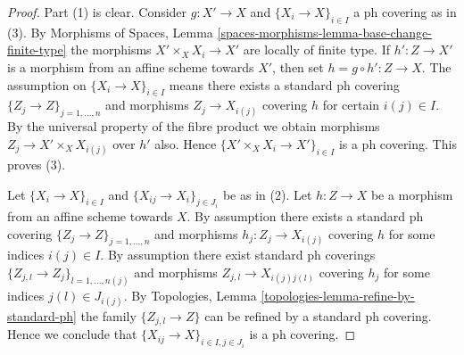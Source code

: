 \documentclass{stacks-project}
\theoremstyle{plain}
\theoremstyle{definition}
\theoremstyle{remark}
\numberwithin{equation}{subsection}
\begin{document}
\begin{proof}
Part (1) is clear. Consider $g : X' \to X$ and
$\{X_i \to X\}_{i\in I}$ a ph covering as in (3). By
Morphisms of Spaces, Lemma \ref{spaces-morphisms-lemma-base-change-finite-type}
the morphisms $X' \times_X X_i \to X'$ are locally of finite type.
If $h' : Z \to X'$ is a morphism from an affine scheme
towards $X'$, then set $h = g \circ h' : Z \to X$. The assumption
on $\{X_i \to X\}_{i\in I}$ means there exists a standard ph covering
$\{Z_j \to Z\}_{j = 1, \ldots, n}$ and morphisms $Z_j \to X_{i(j)}$ covering
$h$ for certain $i(j) \in I$. By the universal property of the fibre product
we obtain morphisms $Z_j \to X' \times_X X_{i(j)}$ over $h'$ also.
Hence $\{X' \times_X X_i \to X'\}_{i\in I}$ is a ph covering.
This proves (3).

\medskip\noindent
Let $\{X_i \to X\}_{i\in I}$ and $\{X_{ij} \to X_i\}_{j\in J_i}$ be as
in (2). Let $h : Z \to X$ be a morphism from an affine scheme towards $X$.
By assumption there exists a standard ph covering
$\{Z_j \to Z\}_{j = 1, \ldots, n}$ and morphisms $h_j : Z_j \to X_{i(j)}$
covering $h$ for some indices $i(j) \in I$. By assumption there exist
standard ph coverings
$\{Z_{j, l} \to Z_j\}_{l = 1, \ldots, n(j)}$
and morphisms $Z_{j, l} \to X_{i(j)j(l)}$ covering
$h_j$ for some indices $j(l) \in J_{i(j)}$. By
Topologies, Lemma \ref{topologies-lemma-refine-by-standard-ph}
the family $\{Z_{j, l} \to Z\}$ can be refined by a standard ph covering.
Hence we conclude that $\{X_{ij} \to X\}_{i \in I, j\in J_i}$
is a ph covering.
\end{proof}
\end{document}
